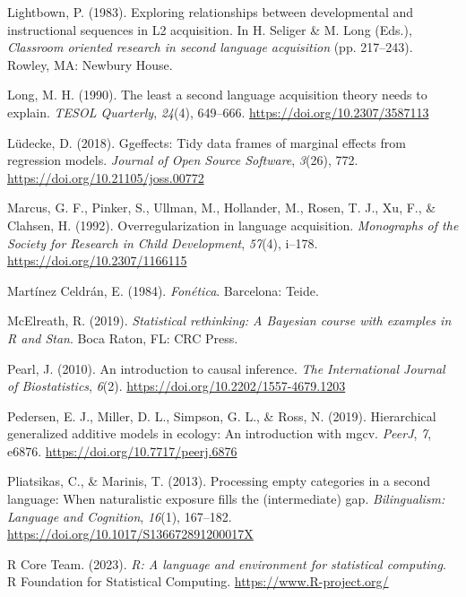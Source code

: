 \documentclass[
  letterpaper,
  DIV=11,
  numbers=noendperiod]{scrartcl}
\newlength{\cslhangindent}
\newenvironment{CSLReferences}[2] %
 {\begin{list}{}{%
  \setlength{\itemindent}{0pt}
  \setlength{\leftmargin}{0pt}
  \setlength{\parsep}{0pt}
  \ifodd #1
   \setlength{\leftmargin}{\cslhangindent}
   \setlength{\itemindent}{-1\cslhangindent}
  \fi
  \setlength{\itemsep}{#2\baselineskip}}}
 {\end{list}}
\begin{document}
\begin{CSLReferences}{1}{0}
Lightbown, P. (1983). Exploring relationships between developmental and
instructional sequences in {L}2 acquisition. In H. Seliger \& M. Long
(Eds.), \emph{Classroom oriented research in second language
acquisition} (pp. 217--243). Rowley, MA: Newbury House.

Long, M. H. (1990). The least a second language acquisition theory needs
to explain. \emph{TESOL Quarterly}, \emph{24}(4), 649--666.
\url{https://doi.org/10.2307/3587113}

Lüdecke, D. (2018). Ggeffects: Tidy data frames of marginal effects from
regression models. \emph{Journal of Open Source Software}, \emph{3}(26),
772. \url{https://doi.org/10.21105/joss.00772}

Marcus, G. F., Pinker, S., Ullman, M., Hollander, M., Rosen, T. J., Xu,
F., \& Clahsen, H. (1992). Overregularization in language acquisition.
\emph{Monographs of the Society for Research in Child Development},
\emph{57}(4), i--178. \url{https://doi.org/10.2307/1166115}

Martínez Celdrán, E. (1984). \emph{Fon{é}tica}. Barcelona: Teide.

McElreath, R. (2019). \emph{Statistical rethinking: A {B}ayesian course
with examples in {R} and {S}tan}. Boca Raton, FL: CRC Press.

Pearl, J. (2010). An introduction to causal inference. \emph{The
International Journal of Biostatistics}, \emph{6}(2).
\url{https://doi.org/10.2202/1557-4679.1203}

Pedersen, E. J., Miller, D. L., Simpson, G. L., \& Ross, N. (2019).
Hierarchical generalized additive models in ecology: An introduction
with mgcv. \emph{PeerJ}, \emph{7}, e6876.
\url{https://doi.org/10.7717/peerj.6876}

Pliatsikas, C., \& Marinis, T. (2013). Processing empty categories in a
second language: When naturalistic exposure fills the (intermediate)
gap. \emph{Bilingualism: Language and Cognition}, \emph{16}(1),
167--182. \url{https://doi.org/10.1017/S136672891200017X}

R Core Team. (2023). \emph{R: A language and environment for statistical
computing}. R Foundation for Statistical Computing.
\url{https://www.R-project.org/}


\end{CSLReferences}
\end{document}
